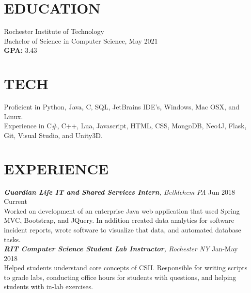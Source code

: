 \documentclass[line, margin]{res}
\begin{document}
\address{(484) 554-8487\\ emp9173@rit.edu}




 
 
 
\begin{resume}
\section{EDUCATION} 
 Rochester Institute of Technology \\
 Bachelor of Science in Computer Science, May 2021\\
 \textbf{GPA:} 3.43
 
\section{TECH}
Proficient in Python, Java, C, SQL, JetBrains IDE’s, Windows, Mac OSX, and Linux. \\
Experience in C\#, C++, Lua, Javascript, HTML, CSS, MongoDB, Neo4J, Flask, Git, Visual Studio, and Unity3D.
 
\section{EXPERIENCE} 
\textit{\textbf{Guardian Life IT and Shared Services Intern}, Bethlehem PA} \hfill Jun 2018-Current \\
Worked on development of an enterprise Java web application that used Spring MVC, Bootstrap, and JQuery.  In addition created
data analytics for software incident reports, wrote software to visualize that data, and automated database tasks.\\ [10pt]
\textit{\textbf{RIT Computer Science Student Lab Instructor}, Rochester NY} \hfill Jan-May 2018 \\
Helped students understand core concepts of CSII. Responsible for writing scripts
to grade labs, conducting office hours for students with questions, and helping students
with in-lab exercises.


\end{resume}
\end{document}
